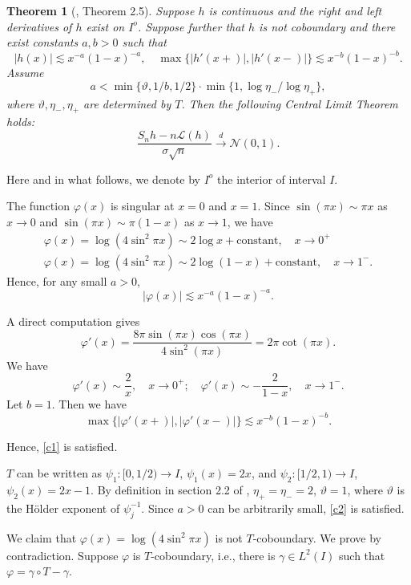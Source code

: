 \documentclass{amsart}
\newtheorem{thm}{Theorem}
\theoremstyle{definition}
\begin{document}
\begin{thm}[\cite{FS26}, Theorem 2.5]\label{thm1}
Suppose $h$ is continuous and the right and left derivatives of $h$ exist on $I^o$. 
Suppose further that $h$ is not coboundary and there exist constants $a, b> 0$ such that
\begin{equation}\label{c1}
|h(x)| \lesssim x^{-a}(1-x)^{-a},\quad
\max\{|h'(x+)|, |h'(x-)|\} \lesssim x^{-b}(1-x)^{-b}.
\end{equation}
Assume
\begin{equation}\label{c2}
a < \min\{\vartheta, 1/b, 1/2\} \cdot \min\{1, \log \eta_- / \log \eta_+\},
\end{equation}
where $\vartheta, \eta_-, \eta_+$ are  determined by $T$. 
Then the following Central Limit Theorem holds:
$$\frac{S_n h - n \mathcal{L}(h)}{\sigma\sqrt{n}}\xrightarrow{d} \mathscr{N}(0,1).$$
\end{thm}
Here and in what follows, we denote by $I^o$ the interior of interval $I$.

The function \(\varphi(x)\) is singular at \(x=0\) and \(x=1\).
Since $\sin(\pi x) \sim \pi x$ as $x\to0$ 
and $\sin(\pi x) \sim \pi (1-x)$ as \(x\to 1\), we have
$$\begin{array}{l}
\varphi(x) = \log(4\sin^2\pi x) \sim 2\log x + \text{constant}, \quad x \to 0^+\\
\varphi(x) = \log(4\sin^2\pi x) \sim 2\log(1-x) + \text{constant}, \quad x \to 1^-.
\end{array}$$
Hence, for any small \(a>0\), 
$$|\varphi(x)| \lesssim x^{-a}(1-x)^{-a}.$$

A direct computation gives 
$$\varphi'(x) = \frac{8\pi \sin(\pi x)\cos(\pi x)}{4\sin^2(\pi x)} = 2\pi \cot(\pi x).$$
We have
$$
\varphi'(x) \sim \frac{2}{x}, \quad x \to 0^+; \quad \varphi'(x) \sim -\frac{2}{1-x}, \quad x \to 1^-.
$$
Let \(b=1\). Then we have
$$\max\{|\varphi'(x+)|, |\varphi'(x-)|\} \lesssim x^{-b}(1-x)^{-b}.$$

Hence,  \eqref{c1} is satisfied.


$T$ can be written as $\psi_1:[0,1/2)\to I$, $\psi_1(x)=2x$, and $\psi_2:[1/2,1)\to I$, $\psi_2(x)=2x-1$.
By definition in section 2.2 of \cite{FS26}, $\eta_+=\eta_-=2$, $\vartheta=1$, 
where $\vartheta$ is the H\"{o}lder exponent of $\psi_j^{-1}$.
Since $a>0$ can be arbitrarily small, \eqref{c2} is satisfied.


We claim that \(\varphi(x)=\log(4\sin^2\pi x)\) is not $T$-coboundary. 
We prove by contradiction. 
Suppose $\varphi$ is $T$-coboundary, i.e., there is \(\gamma\in L^2(I)\) 
such that \(\varphi = \gamma \circ T - \gamma\). 
\end{document}
